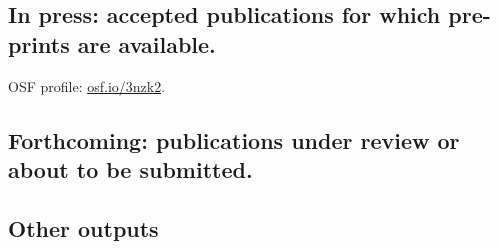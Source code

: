 \documentclass[10pt,a4paper,]{article}
\newcounter{papers}
\begin{document}
\nocite{langton2019cartograms,
solymosi2019exploring,
solymosi2018did,
solymosi2018role,
solymosi2017crowdsourcing,
solymosi2015mapping,
solymosi2015crowd}

\hypertarget{in-press-accepted-publications-for-which-pre-prints-are-available.}{%
\subsection{In press: accepted publications for which pre-prints are available.}\label{in-press-accepted-publications-for-which-pre-prints-are-available.}}

OSF profile: \url{osf.io/3nzk2}.

\newrefcontext[sorting=none]\setcounter{papers}{0}\pagebreak[3]
\printbibliography[category=bib-forthcoming.bib-1297557,heading=none]\setcounter{papers}{0}

\nocite{buil2019non,
solymosia2017alternative}

\hypertarget{forthcoming-publications-under-review-or-about-to-be-submitted.}{%
\subsection{Forthcoming: publications under review or about to be submitted.}\label{forthcoming-publications-under-review-or-about-to-be-submitted.}}

\newrefcontext[sorting=none]\setcounter{papers}{0}\pagebreak[3]
\printbibliography[category=bib-underreview.bib-1300753,heading=none]\setcounter{papers}{0}

\nocite{enghodd2019topmod,
solymosi2019place,
solymosi2019mispers,
solymosi2019safecity,
solymosi2019ccjs,
solymosi2019experiment}

\hypertarget{other-outputs}{%
\subsection{Other outputs}\label{other-outputs}}

\newrefcontext[sorting=none]\setcounter{papers}{0}\pagebreak[3]
\printbibliography[category=bib-otherpubs.bib-1304238,heading=none]\setcounter{papers}{0}
\end{document}
